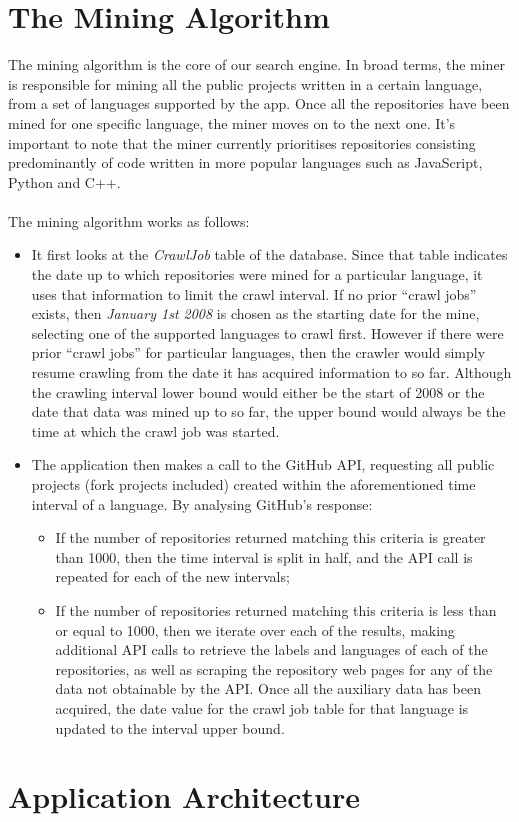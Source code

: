 \newpage
\section{The Mining Algorithm}

The mining algorithm is the core of our search engine.
In broad terms, the miner is responsible for mining all the public projects written in a certain language, from a set of languages supported by the app.
Once all the repositories have been mined for one specific language, the miner moves on to the next one.
It's important to note that the miner currently prioritises repositories consisting predominantly of code written in more popular languages such as JavaScript, Python and C++.
\\\\
\noindent
The mining algorithm works as follows:
\begin{itemize}
    \item It first looks at the \textit{CrawlJob} table of the database. Since that table indicates the date up to which repositories were mined for a particular language, it uses that information to limit the crawl interval. If no prior ``crawl jobs'' exists, then \textit{January 1st 2008} is chosen as the starting date for the mine, selecting one of the supported languages to crawl first. However if there were prior ``crawl jobs'' for particular languages, then the crawler would simply resume crawling from the date it has acquired information to so far. Although the crawling interval lower bound would either be the start of 2008 or the date that data was mined up to so far, the upper bound would always be the time at which the crawl job was started.
    \item The application then makes a call to the GitHub API, requesting all public projects (fork projects included) created within the aforementioned time interval of a language. By analysing GitHub's response:
    \begin{itemize}
        \item If the number of repositories returned matching this criteria is greater than 1000, then the time interval is split in half, and the API call is repeated for each of the new intervals;
        \item If the number of repositories returned matching this criteria is less than or equal to 1000, then we iterate over each of the results, making additional API calls to retrieve the labels and languages of each of the repositories, as well as scraping the repository web pages for any of the data not obtainable by the API\@. Once all the auxiliary data has been acquired, the date value for the crawl job table for that language is updated to the interval upper bound.
    \end{itemize}
\end{itemize}

\section{Application Architecture}